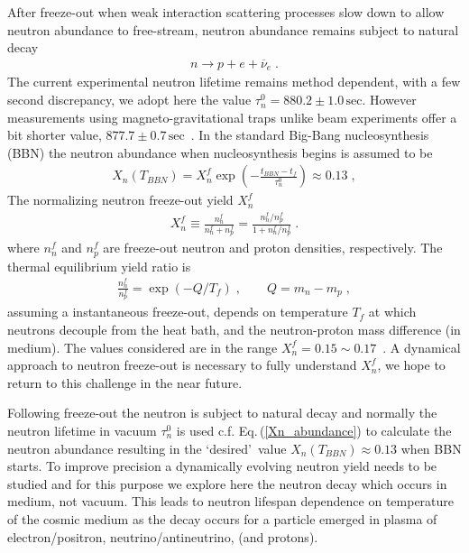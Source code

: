 After freeze-out when weak interaction scattering processes slow down to allow neutron abundance to free-stream,  neutron abundance remains  subject to natural decay
\begin{align}\label{Ndec}
n\longrightarrow p+e+\overline{\nu}_e\;.
\end{align}
The current experimental neutron lifetime remains method dependent, with a few second discrepancy, we adopt here the value  $\tau_n^0=880.2\pm1.0\,\mathrm{sec}$. However measurements  using magneto-gravitational traps unlike beam experiments offer a bit shorter value,  $877.7\pm0.7\,\mathrm{sec}$~\cite{Pattie:2017vsj}. In the standard Big-Bang nucleosynthesis (BBN) the neutron abundance when nucleosynthesis begins is assumed to be~\cite{Pitrou:2018cgg}
\begin{align}
\label{Xn_abundance}
X_n(T_{BBN})=X_n^f\exp\left(-\frac{t_{BBN}-t_f}{\tau_n^0}\right)\approx0.13\;,
\end{align}
The normalizing neutron freeze-out yield $X_n^f$ 
\begin{align}
\label{Xn_abundance2}
X_n^f \equiv  \frac{n_n^f}{n_n^f+n_p^f}= \frac{n_n^f/n_p^f}{1+n_n^f/n_p^f}\;.
\end{align}
where $n_n^f$ and $n_p^f$ are freeze-out neutron and proton densities, respectively. The thermal equilibrium yield ratio is
\begin{align}
\label{Xn_abundance3}
 \frac{n_n^f}{n_p^f}= \exp\left(-Q/T_f\right)\;,\qquad Q=m_n-m_p\;,
\end{align}
assuming a instantaneous freeze-out, depends on temperature $T_f$ at which neutrons decouple from the heat bath, and the neutron-proton mass difference (in medium). The values considered  are in the range $X_n^f=0.15\sim0.17$~\cite{Pitrou:2018cgg}. A dynamical approach to neutron freeze-out is necessary to fully understand $X_n^f$, we hope to return to this challenge in the near  future.

Following freeze-out the neutron is subject to natural decay and normally the neutron lifetime in vacuum $\tau_n^0$ is used c.f. Eq.\,(\ref{Xn_abundance}) to calculate the neutron abundance resulting in the \lq desired\rq\ value $X_n(T_{BBN})\approx0.13$ when BBN starts. To improve precision a dynamically evolving neutron yield needs to be studied and for this purpose we explore here the neutron decay which occurs in  medium, not vacuum. This leads to  neutron lifespan dependence on temperature of the cosmic medium as the decay occurs for a particle emerged in plasma of electron/positron, neutrino/antineutrino, (and protons).

